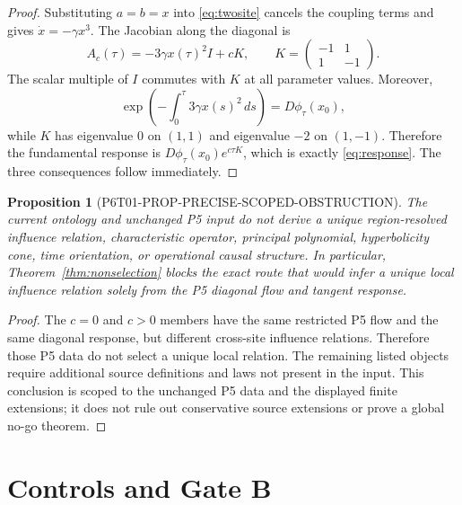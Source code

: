 \documentclass[11pt]{article}
\newtheorem{proposition}{Proposition}
\begin{document}
\begin{proof}
Substituting \(a=b=x\) into \eqref{eq:twosite} cancels the coupling terms and
gives \(\dot x=-\gamma x^3\).  The Jacobian along the diagonal is
\[
 A_c(\tau)=
 -3\gamma x(\tau)^2 I+
 cK,\qquad
 K=
 \begin{pmatrix}-1&1\\1&-1\end{pmatrix}.
\]
The scalar multiple of \(I\) commutes with \(K\) at all parameter values.
Moreover,
\[
 \exp\!\left(-\int_0^\tau3\gamma x(s)^2\,ds\right)
 =D\phi_\tau(x_0),
\]
while \(K\) has eigenvalue \(0\) on \((1,1)\) and eigenvalue \(-2\) on
\((1,-1)\).  Therefore the fundamental response is
\(D\phi_\tau(x_0)e^{c\tau K}\), which is exactly
\eqref{eq:response}.  The three consequences follow immediately.
\end{proof}

\begin{proposition}[P6T01-PROP-PRECISE-SCOPED-OBSTRUCTION]
\label{prop:obstruction}
The current ontology and unchanged P5 input do not derive a unique
region-resolved influence relation, characteristic operator, principal
polynomial, hyperbolicity cone, time orientation, or operational causal
structure.  In particular, Theorem~\ref{thm:nonselection} blocks the exact
route that would infer a unique local influence relation solely from the P5
diagonal flow and tangent response.
\end{proposition}

\begin{proof}
The \(c=0\) and \(c>0\) members have the same restricted P5 flow and the same
diagonal response, but different cross-site influence relations.  Therefore
those P5 data do not select a unique local relation.  The remaining listed
objects require additional source definitions and laws not present in the
input.  This conclusion is scoped to the unchanged P5 data and the displayed
finite extensions; it does not rule out conservative source extensions or
prove a global no-go theorem.
\end{proof}

\section{Controls and Gate B}
\end{document}
